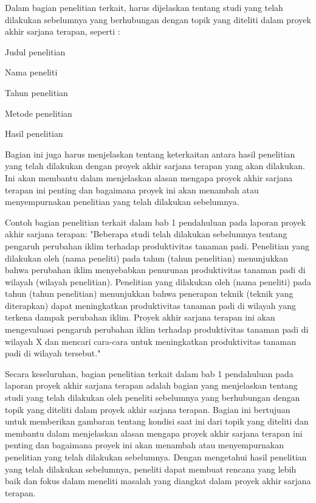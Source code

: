 Dalam bagian penelitian terkait, harus dijelaskan tentang studi yang telah dilakukan sebelumnya yang berhubungan dengan topik yang diteliti dalam proyek akhir sarjana terapan, seperti :

\begin{packed_enum}
    \item Judul penelitian
    \item Nama peneliti
    \item Tahun penelitian
    \item Metode penelitian
    \item Hasil penelitian
\end{packed_enum}

Bagian ini juga harus menjelaskan tentang keterkaitan antara hasil penelitian yang telah dilakukan dengan proyek akhir sarjana terapan yang akan dilakukan. Ini akan membantu dalam menjelaskan alasan mengapa proyek akhir sarjana terapan ini penting dan bagaimana proyek ini akan menambah atau menyempurnakan penelitian yang telah dilakukan sebelumnya.

Contoh bagian penelitian terkait dalam bab 1 pendahuluan pada laporan proyek akhir sarjana terapan:
"Beberapa studi telah dilakukan sebelumnya tentang pengaruh perubahan iklim terhadap produktivitas tanaman padi. Penelitian yang dilakukan oleh (nama peneliti) pada tahun (tahun penelitian) menunjukkan bahwa perubahan iklim menyebabkan penurunan produktivitas tanaman padi di wilayah (wilayah penelitian). Penelitian yang dilakukan oleh (nama peneliti) pada tahun (tahun penelitian) menunjukkan bahwa penerapan teknik (teknik yang diterapkan) dapat meningkatkan produktivitas tanaman padi di wilayah yang terkena dampak perubahan iklim. Proyek akhir sarjana terapan ini akan mengevaluasi pengaruh perubahan iklim terhadap produktivitas tanaman padi di wilayah X dan mencari cara-cara untuk meningkatkan produktivitas tanaman padi di wilayah tersebut."

Secara keseluruhan, bagian penelitian terkait dalam bab 1 pendahuluan pada laporan proyek akhir sarjana terapan adalah bagian yang menjelaskan tentang studi yang telah dilakukan oleh peneliti sebelumnya yang berhubungan dengan topik yang diteliti dalam proyek akhir sarjana terapan. Bagian ini bertujuan untuk memberikan gambaran tentang kondisi saat ini dari topik yang diteliti dan membantu dalam menjelaskan alasan mengapa proyek akhir sarjana terapan ini penting dan bagaimana proyek ini akan menambah atau menyempurnakan penelitian yang telah dilakukan sebelumnya. Dengan mengetahui hasil penelitian yang telah dilakukan sebelumnya, peneliti dapat membuat rencana yang lebih baik dan fokus dalam meneliti masalah yang diangkat dalam proyek akhir sarjana terapan.

